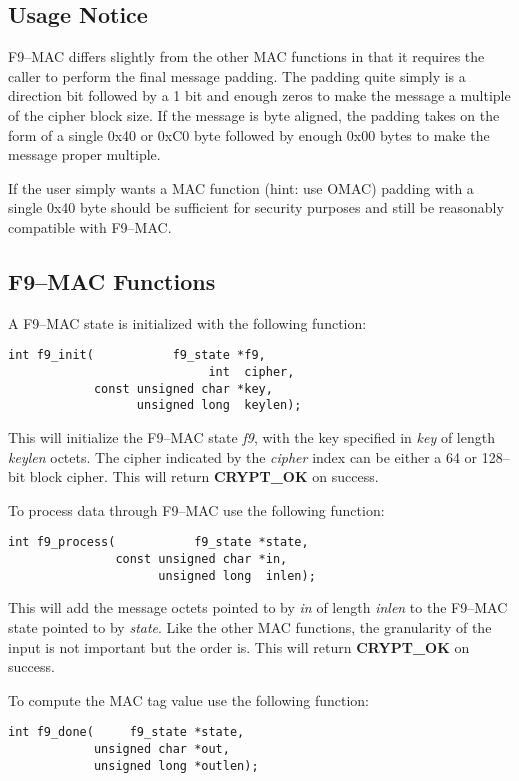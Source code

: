\documentclass[synpaper]{book}
\begin{document}
\subsection{Usage Notice}
F9--MAC differs slightly from the other MAC functions in that it requires the caller to perform the final message padding.  The padding quite simply is a direction
bit followed by a 1 bit and enough zeros to make the message a multiple of the cipher block size.  If the message is byte aligned, the padding takes on the form of 
a single 0x40 or 0xC0 byte followed by enough 0x00 bytes to make the message proper multiple.  

If the user simply wants a MAC function (hint: use OMAC) padding with a single 0x40 byte should be sufficient for security purposes and still be reasonably compatible
with F9--MAC.

\subsection{F9--MAC Functions}
A F9--MAC state is initialized with the following function:
\begin{verbatim}
int f9_init(           f9_state *f9, 
                            int  cipher, 
            const unsigned char *key, 
                  unsigned long  keylen);
\end{verbatim}

This will initialize the F9--MAC state \textit{f9}, with the key specified in \textit{key} of length \textit{keylen} octets.  The cipher indicated
by the \textit{cipher} index can be either a 64 or 128--bit block cipher.  This will return \textbf{CRYPT\_OK} on success.

To process data through F9--MAC use the following function:
\begin{verbatim}
int f9_process(           f9_state *state, 
               const unsigned char *in, 
                     unsigned long  inlen);
\end{verbatim}

This will add the message octets pointed to by \textit{in} of length \textit{inlen} to the F9--MAC state pointed to by \textit{state}.  Like the other MAC functions,
the granularity of the input is not important but the order is.  This will return \textbf{CRYPT\_OK} on success.

To compute the MAC tag value use the following function:

\begin{verbatim}
int f9_done(     f9_state *state, 
            unsigned char *out, 
            unsigned long *outlen);
\end{verbatim}
\end{document}
